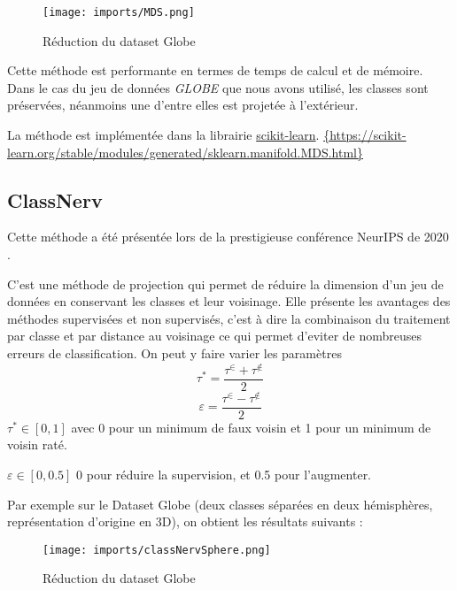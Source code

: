 \begin{center}
    \begin{figure}[ht!]
        \centering
        
        \texttt{[image: imports/MDS.png]}
        
        \caption{Réduction du dataset Globe}
    \end{figure}
\end{center}

Cette méthode est performante en termes de temps de calcul et de mémoire. Dans le cas du jeu de données \textit{GLOBE} que nous avons utilisé, les classes sont préservées, néanmoins une d'entre elles est projetée à l'extérieur.

La méthode est implémentée dans la librairie \href{https://scikit-learn.org/stable/modules/generated/sklearn.manifold.MDS.html}{scikit-learn}.
\url{{https://scikit-learn.org/stable/modules/generated/sklearn.manifold.MDS.html}}


\subsection{ClassNerv}
 Cette méthode a été présentée lors de la prestigieuse conférence NeurIPS de 2020 \cite{colange_steering_2020}.

 C'est une méthode de projection qui permet de réduire la dimension d'un jeu de données en conservant les classes et leur voisinage. 
 Elle présente les avantages des méthodes supervisées et non supervisés, c'est à dire la combinaison du traitement par classe et par distance au voisinage ce qui permet
 d'eviter de nombreuses erreurs de classification.
 On peut y faire varier les paramètres \[\tau^*=\dfrac{\tau^\in + \tau^{\not\in}}{2}\]  \[\varepsilon=\dfrac{\tau^\in - \tau^{\not\in}}{2}\]  
 $ \tau^* \in [0,1] $ avec 0 pour un minimum de faux voisin et 1 pour un minimum de voisin raté. 
 
 \noindent $\varepsilon \in [0,0.5]$ 0 pour réduire la supervision, et 0.5 pour l'augmenter. 
 
 \noindent
 Par exemple sur le Dataset Globe (deux classes séparées en deux hémisphères, représentation d'origine en 3D), on obtient les résultats suivants :


\begin{center}
    \begin{figure}[ht!]
        \centering
        
        \texttt{[image: imports/classNervSphere.png]}
        
        \caption{Réduction du dataset Globe}
    \end{figure}
\end{center}

